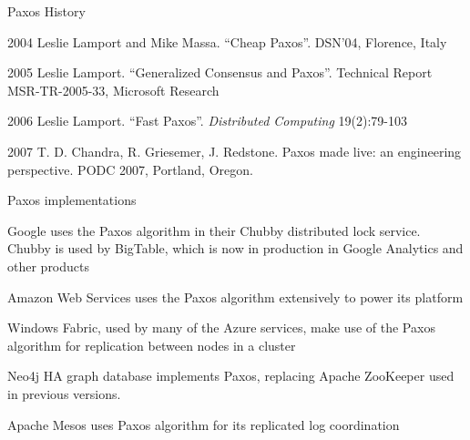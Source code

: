 \begin{frame}{Paxos History}

\BI
\item[2004] Leslie Lamport and Mike Massa. “\alert{Cheap Paxos}”. DSN'04, Florence, Italy
\item[2005] Leslie Lamport. “\alert{Generalized Consensus and Paxos}”. Technical Report MSR-TR-2005-33, Microsoft Research
\item[2006] Leslie Lamport. “\alert{Fast Paxos}”. \emph{Distributed Computing} 19(2):79-103
\EI

\medskip
{}

\BI
\item[2007] T. D. Chandra, R. Griesemer, J. Redstone.
\alert{Paxos made live: an engineering perspective}. PODC 2007, Portland, Oregon.
\EI




\end{frame}

	


\begin{frame}{Paxos implementations}
\BIL
\item Google uses the Paxos algorithm in their Chubby distributed lock service. Chubby is used by BigTable,  which is now in production in Google Analytics and other products
\item Amazon Web Services uses the Paxos algorithm extensively to power its platform
\item Windows Fabric, used by many of the Azure services, make use of the Paxos algorithm for replication between nodes in a cluster
\item Neo4j HA graph database implements Paxos, replacing Apache ZooKeeper used
in previous versions.
\item Apache Mesos uses Paxos algorithm for its replicated log coordination
\EIL
	
\end{frame}

